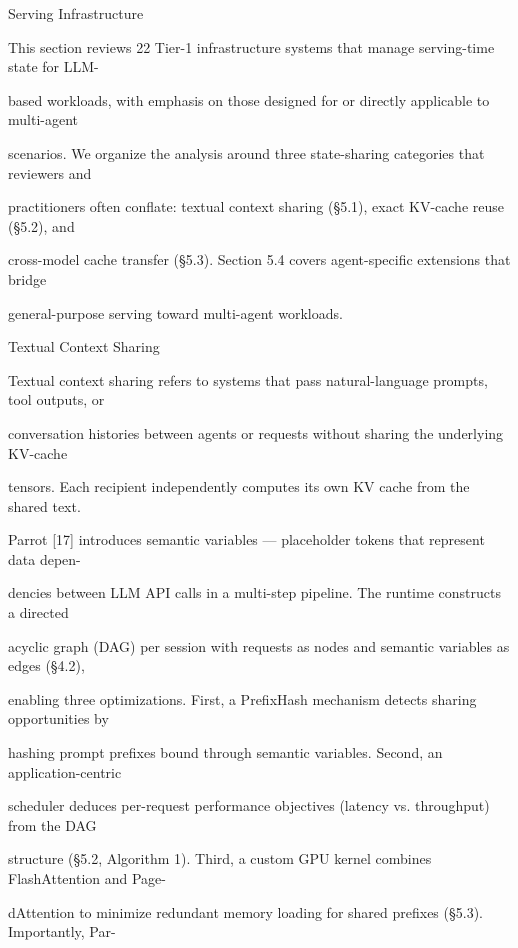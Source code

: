 \begin{flushleft}
 Serving Infrastructure\par
\noindent This section reviews 22 Tier-1 infrastructure systems that manage serving-time state for LLM-\par
\noindent based workloads, with emphasis on those designed for or directly applicable to multi-agent\par
\noindent scenarios. We organize the analysis around three state-sharing categories that reviewers and\par
\noindent practitioners often conflate: textual context sharing (§5.1), exact KV-cache reuse (§5.2), and\par
\noindent cross-model cache transfer (§5.3). Section 5.4 covers agent-specific extensions that bridge\par
\noindent general-purpose serving toward multi-agent workloads.\par
\par\smallskip
{} Textual Context Sharing\par
\noindent Textual context sharing refers to systems that pass natural-language prompts, tool outputs, or\par
\noindent conversation histories between agents or requests without sharing the underlying KV-cache\par
\noindent tensors. Each recipient independently computes its own KV cache from the shared text.\par
\noindent  Parrot [17] introduces semantic variables — placeholder tokens that represent data depen-\par
\noindent dencies between LLM API calls in a multi-step pipeline. The runtime constructs a directed\par
\noindent acyclic graph (DAG) per session with requests as nodes and semantic variables as edges (§4.2),\par
\noindent enabling three optimizations. First, a PrefixHash mechanism detects sharing opportunities by\par
\noindent hashing prompt prefixes bound through semantic variables. Second, an application-centric\par
\noindent scheduler deduces per-request performance objectives (latency vs. throughput) from the DAG\par
\noindent structure (§5.2, Algorithm 1). Third, a custom GPU kernel combines FlashAttention and Page-\par
\noindent dAttention to minimize redundant memory loading for shared prefixes (§5.3). Importantly, Par-\par

\end{flushleft}
